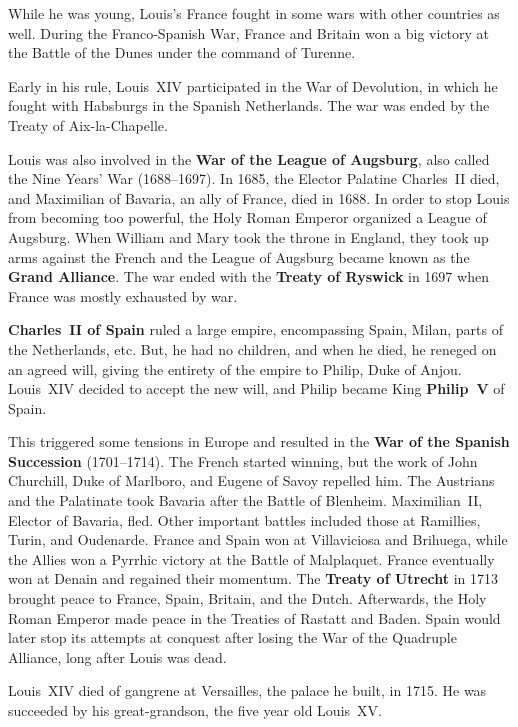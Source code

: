 While he was young, Louis's France fought in some wars with other countries as well.
During the Franco-Spanish War,
France and Britain won a big victory at the Battle of the Dunes under the command of Turenne.

Early in his rule, Louis~XIV participated in the War of Devolution,
in which he fought with Habsburgs in the Spanish Netherlands.
The war was ended by the Treaty of Aix-la-Chapelle.

Louis was also involved in the \textbf{War of the League of Augsburg},
also called the Nine Years' War (1688--1697).
In 1685, the Elector Palatine Charles~II died,
and Maximilian of Bavaria, an ally of France, died in 1688.
In order to stop Louis from becoming too powerful, the Holy Roman Emperor organized a League of Augsburg.
When William and Mary took the throne in England,
they took up arms against the French and the League of Augsburg became known as the \textbf{Grand Alliance}.
The war ended with the \textbf{Treaty of Ryswick} in 1697 when France was mostly exhausted by war.

\textbf{Charles~II of Spain} ruled a large empire, encompassing Spain, Milan, parts of the Netherlands, etc.
But, he had no children, and when he died, he reneged on an agreed will,
giving the entirety of the empire to Philip, Duke of Anjou.
Louis~XIV decided to accept the new will, and Philip became King \textbf{Philip~V} of Spain.

This triggered some tensions in Europe
and resulted in the \textbf{War of the Spanish Succession} (1701--1714).
The French started winning, but the work of John Churchill, Duke of Marlboro, and Eugene of Savoy repelled him.
The Austrians and the Palatinate took Bavaria after the Battle of Blenheim.
Maximilian~II, Elector of Bavaria, fled.
Other important battles included those at Ramillies, Turin, and Oudenarde.
France and Spain won at Villaviciosa and Brihuega,
while the Allies won a Pyrrhic victory at the Battle of Malplaquet.
France eventually won at Denain and regained their momentum.
The \textbf{Treaty of Utrecht} in 1713 brought peace to France, Spain, Britain, and the Dutch.
Afterwards, the Holy Roman Emperor made peace in the Treaties of Rastatt and Baden.
Spain would later stop its attempts at conquest after losing the War of the Quadruple Alliance,
long after Louis was dead.

Louis~XIV died of gangrene at Versailles, the palace he built, in 1715.
He was succeeded by his great-grandson, the five year old Louis~XV\@.

